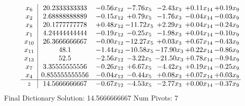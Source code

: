 \documentclass[9pt]{article}
\begin{document}
 \[\begin{array}{c| c c@{\hskip 2pt} c@{\hskip 2pt} c@{\hskip 2pt} c@{\hskip 2pt} c@{\hskip 2pt} }
 x_{6}   &  20.2333333333 & -0.56 x_{12} & -7.76 x_{5} & -2.43 x_{3} & +  0.11 x_{14} & +  0.19 x_{9}\\
 x_{2}   &  2.68888888889 & -0.15 x_{12} & +  0.79 x_{5} & -1.76 x_{3} & -0.04 x_{14} & -0.03 x_{9}\\
 x_{8}   &  20.1777777778 & +  0.48 x_{12} & -11.72 x_{5} & +  2.29 x_{3} & +  0.04 x_{14} & -0.24 x_{9}\\
 x_{1}   &  4.24444444444 & -0.19 x_{12} & -0.25 x_{5} & -1.98 x_{3} & +  0.04 x_{14} & -0.10 x_{9}\\
 x_{10}   &  26.3666666667 & -0.00 x_{12} & -12.27 x_{5} & +  0.03 x_{3} & +  0.67 x_{14} & -0.43 x_{9}\\
 x_{11}   &  48.1 & -1.44 x_{12} & -10.58 x_{5} & -17.90 x_{3} & +  0.22 x_{14} & -0.86 x_{9}\\
 x_{13}   &  52.5 & -2.56 x_{12} & -3.22 x_{5} & -21.50 x_{3} & +  0.78 x_{14} & -0.94 x_{9}\\
 x_{7}   &  3.35555555556 & -0.26 x_{12} & +  6.67 x_{5} & -4.42 x_{3} & +  0.19 x_{14} & -0.25 x_{9}\\
 x_{4}   &  0.855555555556 & -0.04 x_{12} & -0.44 x_{5} & +  0.08 x_{3} & +  0.07 x_{14} & +  0.03 x_{9}\\
\hline
z    &  14.5666666667 & -0.67 x_{12} & -4.53 x_{5} & -2.77 x_{3} & +  0.00 x_{14} & -0.37 x_{9}\\
\end{array}\]
Final Dictionary
Solution:  14.5666666667
Num Pivots:  7
\end{document}
